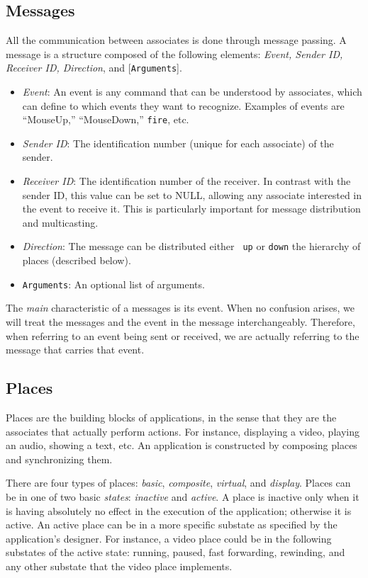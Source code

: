 \documentclass[twocolumn,10pt]{article}
\newcommand{\fire}{{\tt fire}}
\begin{document}
\subsection*{Messages}

All the communication between associates is done through message
passing.  A message is a structure composed of the following elements:
{\em Event, Sender ID, Receiver ID, Direction}, and [{\tt Arguments}].

\begin{itemize}
  \item {\em Event}: An event is any command that can be understood by 
        associates, which can
        define to which events they want to recognize.  Examples of events are
        ``MouseUp,'' ``MouseDown,'' \fire, etc.
  \item {\em Sender ID}: The identification number (unique for each associate)
        of the sender.
  \item {\em Receiver ID}: The identification number of the receiver.
        In contrast with the sender ID,  this
        value can be set to NULL, allowing any associate interested in the
        event to receive it.  This is particularly important for message
        distribution and multicasting.
  \item {\em Direction}: The message can be distributed either {\tt
        up} or {\tt down} the hierarchy of places (described below).
  \item {\tt Arguments}: An optional list of arguments.
\end{itemize}

The {\em main} characteristic of a messages is its event.  When no confusion
arises, we will treat the messages and the event in the message
interchangeably.  Therefore, when referring to an event being sent or
received, we are actually referring to the message that carries that
event.


\subsection{Places}

Places are the building blocks of applications, in the sense that they
are the associates that actually perform actions.  For instance,
displaying a video, playing an audio, showing a text, etc.  An application is
constructed by composing places and synchronizing them.

There are four types of places: {\em basic}, {\em composite}, {\em
virtual}, and {\em display}.  Places can be in one of two basic {\em
states}: {\em inactive} and {\em active}.
A place is inactive only when it is having absolutely no effect in the
execution of the application; otherwise it is active.  
An active place can be in a more specific substate as specified by the
application's designer.  For instance, a video place could
be in the following substates of the active state: running, paused,
fast forwarding, rewinding, and any other substate that the video
place implements.
\end{document}

